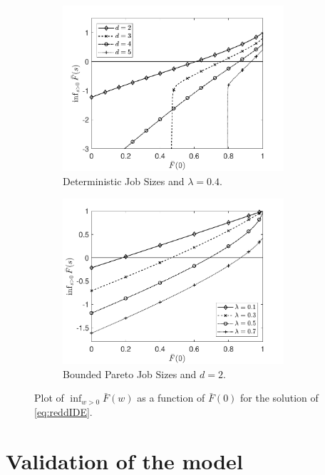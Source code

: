 \documentclass[12pt]{report}
\begin{document}
\begin{figure}[t]
\begin{subfigure}{.45\textwidth}
\centering
\includegraphics[width=0.9\textwidth]{figures/Chapter3/plot_convergence5.pdf}
\caption{Deterministic Job Sizes and $\lambda=0.4$.}
\label{fig:convergence_alg3.1}
\end{subfigure}
\begin{subfigure}{.45\textwidth}
\centering
\includegraphics[width=0.9\textwidth]{figures/Chapter3/plot_convergence6.pdf}
\caption{Bounded Pareto Job Sizes and $d=2$.}
\label{fig:convergence_alg3.2}
\end{subfigure}
\caption{Plot of $\inf_{w>0} \bar F(w)$ as a function of $\bar F(0)$ for the solution of \eqref{eq:reddIDE}.}
\label{fig:convergence_alg3}
\end{figure}
\section{Validation of the model}\label{sec:finAcc_Tompecs}
\end{document}
